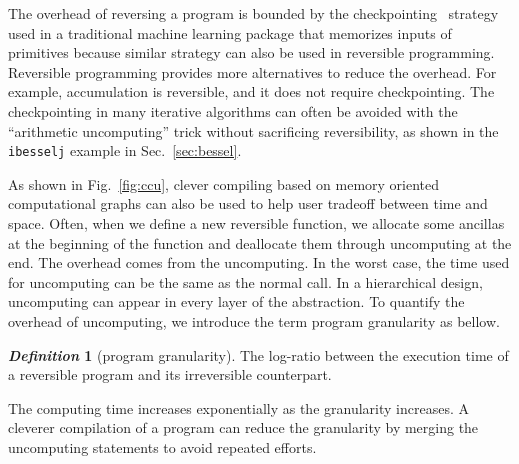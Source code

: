 \documentclass{article}
\newcommand{\<}{\langle}
\renewcommand{\>}{\rangle}
\newcommand{\Fig}[1]{Fig.~\ref{#1}}
\newcommand{\Sec}[1]{Sec.~\ref{#1}}
\theoremstyle{definition}\newtheorem{definition}{\textit{Definition}}
\begin{document}
The overhead of reversing a program is bounded by the checkpointing~\cite{Chen2016} strategy used in a traditional machine learning package that memorizes inputs of primitives because similar strategy can also be used in reversible programming.~\cite{Perumalla2013}
Reversible programming provides more alternatives to reduce the overhead.
For example, accumulation is reversible, and it does not require checkpointing.
The checkpointing in many iterative algorithms can often be avoided with the ``arithmetic uncomputing'' trick without sacrificing reversibility, as shown in the \texttt{ibesselj} example in \Sec{sec:bessel}.

As shown in \Fig{fig:ccu}, clever compiling based on memory oriented computational graphs can also be used to help user tradeoff between time and space.
Often, when we define a new reversible function, we allocate some ancillas at the beginning of the function and deallocate them through uncomputing at the end.
The overhead comes from the uncomputing. In the worst case, the time used for uncomputing can be the same as the normal call.
In a hierarchical design, uncomputing can appear in every layer of the abstraction. To quantify the overhead of uncomputing, we introduce the term program granularity as bellow.
\begin{definition}[program granularity]
    The log-ratio between the execution time of a reversible program and its irreversible counterpart.
\end{definition}
The computing time increases exponentially as the granularity increases.
A cleverer compilation of a program can reduce the granularity by merging the uncomputing statements to avoid repeated efforts.
\end{document}
